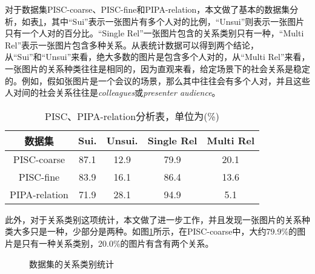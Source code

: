 对于数据集PISC-coarse、PISC-fine和PIPA-relation，本文做了基本的数据集分析，如表\ref{tab:exp-sta-two}，其中``Sui''表示一张图片有多个人对的比例，``Unsui''则表示一张图片只有一个人对的百分比。``Single Rel''一张图片包含的关系类别只有一种，``Multi Rel''表示一张图片包含多种关系。从表统计数据可以得到两个结论，从``Sui''和``Unsui''来看，绝大多数的图片是包含多个人对的，从``Multi Rel''来看，一张图片的关系种类往往是相同的，因为直观来看，给定场景下的社会关系是稳定的。例如，假如张图片是一个会议的场景，那么其中往往会有多个人对，并且这些人对间的社会关系往往是{\it colleagues}或{\it presenter audience}。
\begin{table}[htpb]
  \centering
  \caption{PISC、PIPA-relation分析表，单位为(\%)}
  \label{tab:exp-sta-two}
  \begin{tabular}{c|c|c|c|c}
    \toprule
    数据集 & Sui. & Unsui. & Single Rel & Multi Rel \\
    \midrule
    PISC-coarse  & 87.1 & 12.9 & 79.9 & 20.1 \\
    \midrule
    PISC-fine  & 83.9 & 16.1 & 86.4 & 13.6 \\
    \midrule
    PIPA-relation & 71.9 & 28.1 & 94.9 & 5.1 \\
    \bottomrule
  \end{tabular}
\end{table}

此外，对于关系类别这项统计，本文做了进一步工作，并且发现一张图片的关系种类大多只是一种，少部分是两种。如图\ref{fig:exp-statistic}所示，在PISC-coarse中，大约79.9\%的图片是只有一种关系类别，20.0\%的图片有含有两个关系。

\begin{figure}[htpb]
	\centering
    \caption{数据集的关系类别统计}
	\vspace*{-3.5mm}
	\label{fig:exp-statistic}
\end{figure}

